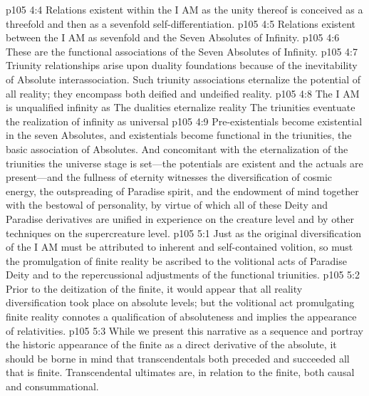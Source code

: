 \pc \vs p105 4:4 \bibnobreakspace {} Relations existent within the I AM as the unity thereof is conceived as a threefold and then as a sevenfold self\hyp{}differentiation.
\vs p105 4:5 \bibnobreakspace {} Relations existent between the I AM as sevenfold and the Seven Absolutes of Infinity.
\vs p105 4:6 \bibnobreakspace {} These are the functional associations of the Seven Absolutes of Infinity.
\pc \vs p105 4:7 Triunity relationships arise upon duality foundations because of the inevitability of Absolute interassociation. Such triunity associations eternalize the potential of all reality; they encompass both deified and undeified reality.
\vs p105 4:8 The I AM is unqualified infinity as  The dualities eternalize reality  The triunities eventuate the realization of infinity as universal 
\vs p105 4:9 Pre\hyp{}existentials become existential in the seven Absolutes, and existentials become functional in the triunities, the basic association of Absolutes. And concomitant with the eternalization of the triunities the universe stage is set---the potentials are existent and the actuals are present---and the fullness of eternity witnesses the diversification of cosmic energy, the outspreading of Paradise spirit, and the endowment of mind together with the bestowal of personality, by virtue of which all of these Deity and Paradise derivatives are unified in experience on the creature level and by other techniques on the supercreature level.
%
\vs p105 5:1 Just as the original diversification of the I AM must be attributed to inherent and self\hyp{}contained volition, so must the promulgation of finite reality be ascribed to the volitional acts of Paradise Deity and to the repercussional adjustments of the functional triunities.
\vs p105 5:2 Prior to the deitization of the finite, it would appear that all reality diversification took place on absolute levels; but the volitional act promulgating finite reality connotes a qualification of absoluteness and implies the appearance of relativities.
\pc \vs p105 5:3 While we present this narrative as a sequence and portray the historic appearance of the finite as a direct derivative of the absolute, it should be borne in mind that transcendentals both preceded and succeeded all that is finite. Transcendental ultimates are, in relation to the finite, both causal and consummational.
